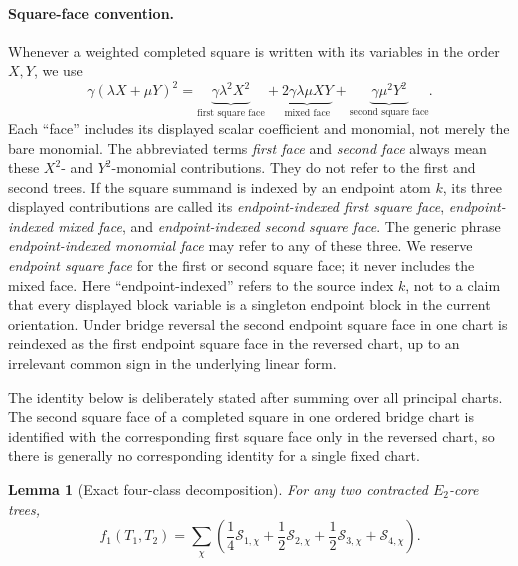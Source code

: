 \documentclass[11pt]{article}
\newtheorem{lemma}[theorem]{Lemma}
\begin{document}
\paragraph{Square-face convention.}
Whenever a weighted completed square is written with its variables in the
order $X,Y$, we use
\[
\gamma(\lambda X+\mu Y)^2
=
\underbrace{\gamma\lambda^2X^2}_{\text{first square face}}
+
\underbrace{2\gamma\lambda\mu XY}_{\text{mixed face}}
+
\underbrace{\gamma\mu^2Y^2}_{\text{second square face}}.
\]
Each ``face'' includes its displayed scalar coefficient and monomial, not
merely the bare monomial.
The abbreviated terms \emph{first face} and \emph{second face} always mean
these $X^2$- and $Y^2$-monomial contributions.  They do not refer to the
first and second trees.  If the square summand is indexed by an endpoint atom
$k$, its three displayed contributions are called its
\emph{endpoint-indexed first square face}, \emph{endpoint-indexed mixed
face}, and \emph{endpoint-indexed second square face}.  The generic phrase
\emph{endpoint-indexed monomial face} may refer to any of these three.  We
reserve \emph{endpoint square face} for the first or second square face; it
never includes the mixed face.  Here ``endpoint-indexed'' refers to the
source index $k$, not to a claim that every displayed block variable is a
singleton endpoint block in the current orientation.  Under bridge reversal
the second endpoint square face in one chart is reindexed as the first
endpoint square face in the reversed chart, up to an irrelevant common sign
in the underlying linear form.

The identity below is deliberately stated after summing over all principal
charts.  The second square face of a completed square in one ordered bridge
chart is identified with the corresponding first square face only in the
reversed chart, so there is generally no corresponding identity for a single
fixed chart.

\begin{lemma}[Exact four-class decomposition]\label{lem:local-expansion}
For any two contracted $E_2$-core trees,
\begin{equation}\label{eq:exact-four-class-main}
 f_1(T_1,T_2)=
 \sum_{\chi}\left(
 \frac14\mathcal S_{1,\chi}
 +\frac12\mathcal S_{2,\chi}
 +\frac12\mathcal S_{3,\chi}
 +\mathcal S_{4,\chi}\right).
\end{equation}
\end{lemma}
\end{document}
